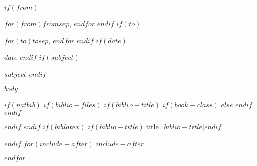 \documentclass[$if(fontsize)$$fontsize$,$endif$$if(lang)$$lang$,$endif$$if(papersize)$$papersize$,$endif$$for(classoption)$$classoption$$sep$,$endfor$]{$documentclass$}
\begin{document}
\vspace{-40pt}
\vspace{-80pt}
\begin{description}[leftmargin=!,itemsep=3pt,labelwidth=\widthof{SUBJECT:  }]
  $if(from)$
    \item[FROM:] $for(from)$$from$$sep$, $endfor$
  $endif$
  $if(to)$
    \item[TO:] $for(to)$$to$$sep$, $endfor$
  $endif$
  $if(date)$
    \item[DATE:] $date$
  $endif$
  $if(subject)$
    \item[SUBJECT:] \bfseries{$subject$}
  $endif$
\end{description}
\vspace{-10pt}
\noindent\makebox[\linewidth]{\rule{\textwidth}{0.4pt}}
\vspace{-25pt}


$body$

$if(natbib)$
$if(biblio-files)$
$if(biblio-title)$
$if(book-class)$
\renewcommand\bibname{$biblio-title$}
$else$
\renewcommand\refname{$biblio-title$}
$endif$
$endif$


$endif$
$endif$
$if(biblatex)$
\printbibliography$if(biblio-title)$[title=$biblio-title$]$endif$

$endif$
$for(include-after)$
$include-after$

$endfor$
\end{document}
